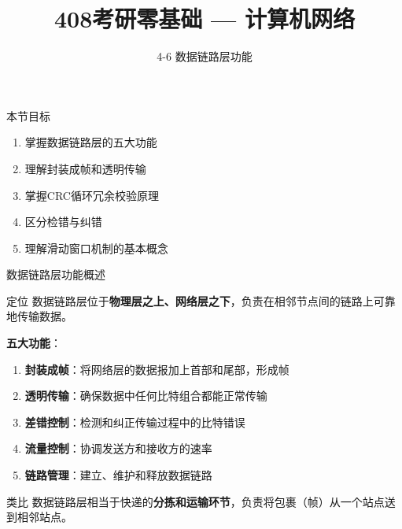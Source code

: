 \documentclass[10pt, aspectratio=169]{beamer}
\title{408考研零基础 --- 计算机网络}
\subtitle{4-6 数据链路层功能}
\author{}
\date{}
\begin{document}
\begin{frame}{本节目标}
    \begin{enumerate}
        \item 掌握数据链路层的五大功能
        \item 理解封装成帧和透明传输
        \item 掌握CRC循环冗余校验原理
        \item 区分检错与纠错
        \item 理解滑动窗口机制的基本概念
    \end{enumerate}
\end{frame}

\begin{frame}{数据链路层功能概述}
    \begin{block}{定位}
        数据链路层位于\textbf{物理层之上、网络层之下}，负责在相邻节点间的链路上可靠地传输数据。
    \end{block}
    \vspace{0.3em}
    \textbf{五大功能}：
    \begin{enumerate}
        \item \textbf{封装成帧}：将网络层的数据报加上首部和尾部，形成帧
        \item \textbf{透明传输}：确保数据中任何比特组合都能正常传输
        \item \textbf{差错控制}：检测和纠正传输过程中的比特错误
        \item \textbf{流量控制}：协调发送方和接收方的速率
        \item \textbf{链路管理}：建立、维护和释放数据链路
    \end{enumerate}
    \vspace{0.3em}
    \begin{exampleblock}{类比}
        数据链路层相当于快递的\textbf{分拣和运输环节}，负责将包裹（帧）从一个站点送到相邻站点。
    \end{exampleblock}
\end{frame}
\end{document}
